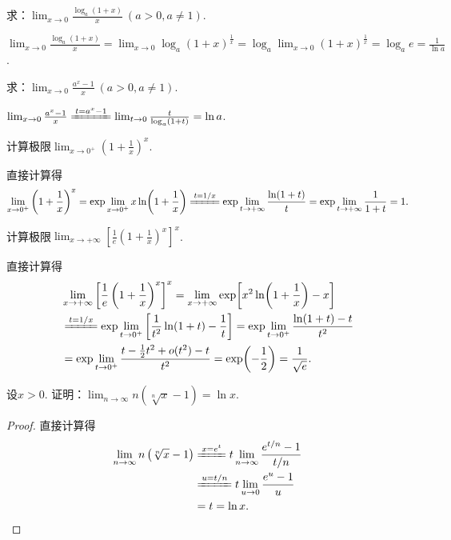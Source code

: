 \begin{example}
求：\(\lim_{x\to0} \frac{\log_a (1+x)}{x}\ (a>0,a\neq1)\).
\begin{solution}
\(\lim_{x\to0} \frac{\log_a (1+x)}{x}
= \lim_{x\to0} \log_a (1+x)^{\frac{1}{x}}
= \log_a \lim_{x\to0} (1+x)^{\frac{1}{x}}
= \log_a e
= \frac{1}{\ln a}\).
\end{solution}
\end{example}

\begin{example}
求：\(\lim_{x\to0} \frac{a^x - 1}{x}\ (a>0,a\neq1)\).
\begin{solution}
\(\lim_{x\to0} \frac{a^x - 1}{x}
\xlongequal{t=a^x-1} \lim_{t\to0}\frac{t}{\log_a (1+t)}
= \ln a\).
\end{solution}
\end{example}

\begin{example}
计算极限\(\lim_{x\to0^+} \left(1+\frac1x\right)^x\).
\begin{solution}
直接计算得\[
	\lim_{x\to0^+} \left(1+\frac1x\right)^x
	= \exp\lim_{x\to0^+} x\ln(1+\frac1x) %
	\xlongequal{t=1/x} \exp\lim_{t\to+\infty} \frac{\ln(1+t)}{t} %
	= \exp\lim_{t\to+\infty} \frac1{1+t} %
	= 1.
\]
\end{solution}
\end{example}

\begin{example}
计算极限\(\lim_{x\to+\infty} \left[ \frac1e \left(1+\frac1x\right)^x \right]^x\).
\begin{solution}
直接计算得\begin{align*}
	&\lim_{x\to+\infty} \left[ \frac1e \left(1+\frac1x\right)^x \right]^x
	= \lim_{x\to+\infty} \exp[x^2 \ln(1+\frac1x) - x] \\
	&\xlongequal{t=1/x} \exp\lim_{t\to0^+} \left[ \frac1{t^2} \ln(1+t) - \frac1t \right]
	= \exp\lim_{t\to0^+} \frac{\ln(1+t)-t}{t^2} \\
	&= \exp\lim_{t\to0^+} \frac{t-\frac12t^2+o(t^2)-t}{t^2}
	= \exp(-\frac12)
	= \frac1{\sqrt{e}}.
\end{align*}
\end{solution}
\end{example}

\begin{example}
设\(x>0\).
证明：\(\lim_{n\to\infty} n \left( \sqrt[n]{x} - 1 \right) = \ln x\).
\begin{proof}
直接计算得\begin{align*}
	\lim_{n\to\infty} n \left( \sqrt[n]{x} - 1 \right)
	&\xlongequal{x = e^t} t \lim_{n\to\infty} \frac{e^{t/n} - 1}{t/n} \\
	&\xlongequal{u=t/n} t \lim_{u\to0} \frac{e^u - 1}u \\
	&= t
	= \ln x.
	\qedhere
\end{align*}
\end{proof}
\end{example}

